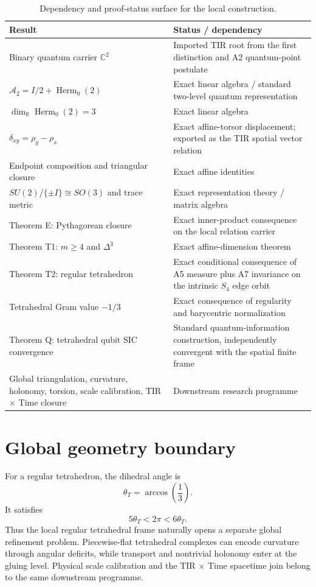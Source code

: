 \documentclass[12pt,a4paper]{article}
\newcommand{\Herm}{\operatorname{Herm}}
\newcommand{\R}{\mathbb{R}}
\newcommand{\C}{\mathbb{C}}
\newcommand{\Astate}{\mathcal{A}_2}
\begin{document}
\begin{table}[htbp]
\centering
\small
\renewcommand{\arraystretch}{1.25}
\begin{tabular}{>{\raggedright\arraybackslash}p{} >{\raggedright\arraybackslash}p{}}
\toprule
\textbf{Result} & \textbf{Status / dependency}\\
\midrule
Binary quantum carrier $\C^2$ & Imported TIR root from the first distinction and A2 quantum-point postulate\\
$\Astate=I/2+\Herm_0(2)$ & Exact linear algebra / standard two-level quantum representation\\
$\dim_{\R}\Herm_0(2)=3$ & Exact linear algebra\\
$\delta_{xy}=\rho_y-\rho_x$ & Exact affine-torsor displacement; exported as the TIR spatial vector relation\\
Endpoint composition and triangular closure & Exact affine identities\\
$SU(2)/\{\pm I\}\cong SO(3)$ and trace metric & Exact representation theory / matrix algebra\\
Theorem E: Pythagorean closure & Exact inner-product consequence on the local relation carrier\\
Theorem T1: $m\ge4$ and $\Delta^3$ & Exact affine-dimension theorem\\
Theorem T2: regular tetrahedron & Exact conditional consequence of A5 measure plus A7 invariance on the intrinsic $S_4$ edge orbit\\
Tetrahedral Gram value $-1/3$ & Exact consequence of regularity and barycentric normalization\\
Theorem Q: tetrahedral qubit SIC convergence & Standard quantum-information construction, independently convergent with the spatial finite frame\\
Global triangulation, curvature, holonomy, torsion, scale calibration, TIR $\times$ Time closure & Downstream research programme\\
\bottomrule
\end{tabular}
\caption{Dependency and proof-status surface for the local construction.}
\label{tab:status}
\end{table}

\section{Global geometry boundary}

For a regular tetrahedron, the dihedral angle is
\[
\boxed{\theta_T=\arccos\left(\frac13\right).}
\]
It satisfies
\[
\boxed{5\theta_T<2\pi<6\theta_T.}
\]
Thus the local regular tetrahedral frame naturally opens a separate global refinement problem. Piecewise-flat tetrahedral complexes can encode curvature through angular deficits, while transport and nontrivial holonomy enter at the gluing level. Physical scale calibration and the TIR $\times$ Time spacetime join belong to the same downstream programme.
\end{document}
